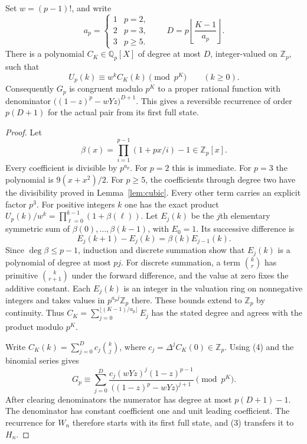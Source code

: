 \documentclass[11pt]{article}
\begin{document}
\begin{theorem}\label{thm:linear}
Set $w=(p-1)!$, and write
\[
 a_p=\begin{cases}1&p=2,\\ 2&p=3,\\ 3&p\ge5.\end{cases}
 \qquad D=p\left\lfloor\frac{K-1}{a_p}\right\rfloor .
\]
There is a polynomial $C_K\in\mathbb Q_p[X]$ of degree at most
$D$, integer-valued on $\mathbb Z_p$, such that
\[
                U_p(k)\equiv w^k C_K(k)\pmod{p^K}
                   \qquad(k\ge0).
\]
Consequently $G_p$ is congruent modulo $p^K$ to a proper rational
function with denominator $\big((1-z)^p-wYz\big)^{D+1}$.
This gives a reversible recurrence of order $p(D+1)$
for the actual pair from its first full state.
\end{theorem}
\begin{proof}
Let
\[
 \beta(x)=\prod_{i=1}^{p-1}(1+px/i)-1\in\mathbb Z_p[x].
\]
Every coefficient is divisible by $p^{a_p}$. For $p=2$ this
is immediate. For $p=3$ the polynomial is $9(x+x^2)/2$.
For $p\ge5$, the coefficients through degree two have the
divisibility proved in Lemma~\ref{lem:cubic}. Every other term
carries an explicit factor $p^3$.
For positive integers $k$ one has the exact product
$U_p(k)/w^k=\prod_{\ell=0}^{k-1}(1+\beta(\ell))$.
Let $E_j(k)$ be the $j$th elementary symmetric sum of
$\beta(0),\ldots,\beta(k-1)$, with $E_0=1$.
Its successive difference is
\[
                    E_j(k+1)-E_j(k)=\beta(k)E_{j-1}(k).
\]
Since $\deg\beta\le p-1$, induction and discrete summation
show that $E_j(k)$ is a polynomial of degree at most $pj$.
For discrete summation, a term $\binom{k}{r}$ has primitive
$\binom{k}{r+1}$ under the forward difference, and the value
at zero fixes the additive constant.
Each $E_j(k)$ is an integer in the valuation ring on
nonnegative integers and takes values in $p^{a_pj}\mathbb Z_p$
there. These bounds extend to $\mathbb Z_p$ by continuity.
Thus $C_K=\sum_{j=0}^{\lfloor(K-1)/a_p\rfloor} E_j$ has the
stated degree and agrees with the product modulo $p^K$.

Write $C_K(k)=\sum_{j=0}^{D}c_j\binom{k}{j}$, where
$c_j=\Delta^j C_K(0)\in\mathbb Z_p$.
Using (4) and the binomial series gives
\[
 G_p\equiv
 \sum_{j=0}^{D}
 \frac{c_j(wYz)^j(1-z)^{p-1}}{\big((1-z)^p-wYz\big)^{j+1}}
                  \pmod{p^K}.
\]
After clearing denominators the numerator has degree at most
$p(D+1)-1$. The denominator has constant coefficient one and
unit leading coefficient. The recurrence for $W_n$ therefore
starts with its first full state, and (3) transfers it to $H_n$.
\end{proof}
\end{document}
